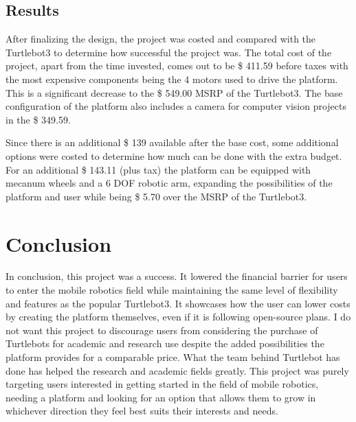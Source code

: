 \documentclass[12pt, letterpaper,titlepage]{article}
\begin{document}
\subsection{Results}
	After finalizing the design, the project was costed and compared with the Turtlebot3 to determine how successful the project was. The total cost of the project, apart from the time invested, comes out to be \$ 411.59 before taxes with the most expensive components being the 4 motors used to drive the platform. This is a significant decrease to the \$ 549.00 MSRP of the Turtlebot3. The base configuration of the platform also includes a camera for computer vision projects in the \$ 349.59. 

	Since there is an additional \$ 139 available after the base cost, some additional options were costed to determine how much can be done with the extra budget. For an additional \$ 143.11 (plus tax) the platform can be equipped with mecanum wheels and a 6 DOF robotic arm, expanding the possibilities of the platform and user while being \$ 5.70 over the MSRP of the Turtlebot3.

\section{Conclusion}
	In conclusion, this project was a success. It lowered the financial barrier for users to enter the mobile robotics field while maintaining the same level of flexibility and features as the popular Turtlebot3. It showcases how the user can lower costs by creating the platform themselves, even if it is following open-source plans. I do not want this project to discourage users from considering the purchase of Turtlebots for academic and research use despite the added possibilities the platform provides for a comparable price. What the team behind Turtlebot has done has helped the research and academic fields greatly. This project was purely targeting users interested in getting started in the field of mobile robotics, needing a platform and looking for an option that allows them to grow in whichever direction they feel best suits their interests and needs. 



\end{document}
